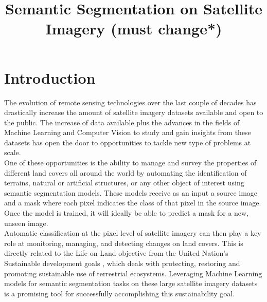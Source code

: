 \documentclass[conference]{IEEEtran}
\begin{document}
\title{Semantic Segmentation on Satellite Imagery (must change*)\\}
\author{
\and
{}
\and
{}
}
\maketitle


\section{Introduction}
The evolution of remote sensing technologies over the last couple of decades has drastically increase the amount of satellite imagery datasets available and open to the public. The increase of data available plus the advances in the fields of Machine Learning and Computer Vision to study and gain insights from these datasets has open the door to opportunities to tackle new type of problems at scale. \\ \indent
One of these opportunities is the ability to manage and survey the properties of different land covers all around the world by automating the identification of terrains, natural or artificial structures, or any other object of interest using semantic segmentation models. These models receive as an input a source image and a mask where each pixel indicates the class of that pixel in the source image. Once the model is trained, it will ideally be able to predict a mask for a new, unseen image.  \\ \indent
Automatic classification at the pixel level of satellite imagery can then play a key role at monitoring, managing, and detecting changes on land covers. This is directly related to the Life on Land objective from the United Nation's Sustainable development goals  \cite{united_nations}, which deals with protecting, restoring and promoting sustainable use of terrestrial ecosystems. Leveraging Machine Learning models for semantic segmentation tasks on these large satellite imagery datasets is a promising tool for successfully accomplishing this sustainability goal.
\end{document}

